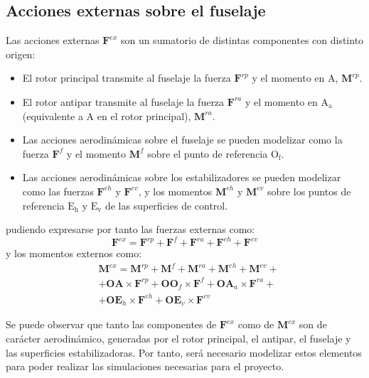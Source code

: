 \subsection{Acciones externas sobre el fuselaje}
Las acciones externas $\mathrm{\textbf{F}}^{ex}$ son un sumatorio de distintas componentes con distinto origen:
\begin{itemize}
	\item El rotor principal transmite al fuselaje la fuerza $\mathrm{\textbf{F}}^{rp}$ y el momento en $\mathrm{A}$, $\mathrm{\textbf{M}}^{rp}$.
	\item El rotor antipar transmite al fuselaje la fuerza $\mathrm{\textbf{F}}^{ra}$ y el momento en $\mathrm{A_a}$ (equivalente a A en el rotor principal), $\mathrm{\textbf{M}}^{ra}$.
	\item Las acciones aerodinámicas sobre el fuselaje se pueden modelizar como la fuerza $\mathrm{\textbf{F}}^{f}$ y el momento $\mathrm{\textbf{M}}^{f}$ sobre el punto de referencia $\mathrm{O_f}$.
	\item Las acciones aerodinámicas sobre los estabilizadores se pueden modelizar como las fuerzas $\mathrm{\textbf{F}}^{eh}$ y $\mathrm{\textbf{F}}^{ev}$, y los momentos $\mathrm{\textbf{M}}^{eh}$ y $\mathrm{\textbf{M}}^{ev}$ sobre los puntos de referencia $\mathrm{E_h}$ y $\mathrm{E_v}$ de las superficies de control.
\end{itemize}
pudiendo expresarse por tanto las fuerzas externas como:
\begin{equation}
	\mathrm{\textbf{F}}^{ex}=\mathrm{\textbf{F}}^{rp}+\mathrm{\textbf{F}}^{f}+\mathrm{\textbf{F}}^{ra}+\mathrm{\textbf{F}}^{eh}+\mathrm{\textbf{F}}^{ev}
\end{equation}
y los momentos externos como:
\begin{equation}
\begin{split}
	&\mathrm{\textbf{M}}^{ex}=\mathrm{\textbf{M}}^{rp}+\mathrm{\textbf{M}}^{f}+\mathrm{\textbf{M}}^{ra}+\mathrm{\textbf{M}}^{eh}+\mathrm{\textbf{M}}^{ev}+ \\
	&+\textbf{OA} \times \mathrm{\textbf{F}}^{rp}+\textbf{O}\textbf{O}_f \times \mathrm{\textbf{F}}^{f}+\textbf{OA}_a \times \mathrm{\textbf{F}}^{ra}+\\
	&+\textbf{OE}_h \times \mathrm{\textbf{F}}^{eh}+\textbf{OE}_v \times \mathrm{\textbf{F}}^{ev}
\end{split}
\end{equation}

Se puede observar que tanto las componentes de $\mathrm{\textbf{F}}^{ex}$ como de $\mathrm{\textbf{M}}^{ex}$ son de carácter aerodinámico, generadas por el rotor principal, el antipar, el fuselaje y las superficies estabilizadoras. Por tanto, será necesario modelizar estos elementos para poder realizar las simulaciones necesarias para el proyecto.

